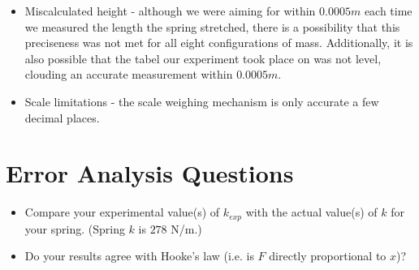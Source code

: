 \begin{itemize}
  \item Miscalculated height - although we were aiming for within $0.0005m$ each time
        we measured the length the spring stretched, there is a possibility that this
        preciseness was not met for all eight configurations of mass. Additionally,
        it is also possible that the tabel our experiment took place on was not level,
        clouding an accurate measurement within $0.0005m$.
  
  \item Scale limitations - the scale weighing mechanism is only accurate a few
        decimal places.
  
\end{itemize}

\section{Error Analysis Questions}

\begin{itemize}
  \item Compare your experimental value(s) of $k_{exp}$ with the actual value(s) of $k$ for 
        your spring. (Spring $k$ is $278$ N/m.)
				
			\begin{center}
			\end{center}
	
  \item Do your results agree with Hooke's law (i.e. is $F$ directly proportional to 
        $x$)?

			\begin{center}
			\end{center}
\end{itemize}
\restoregeometry


